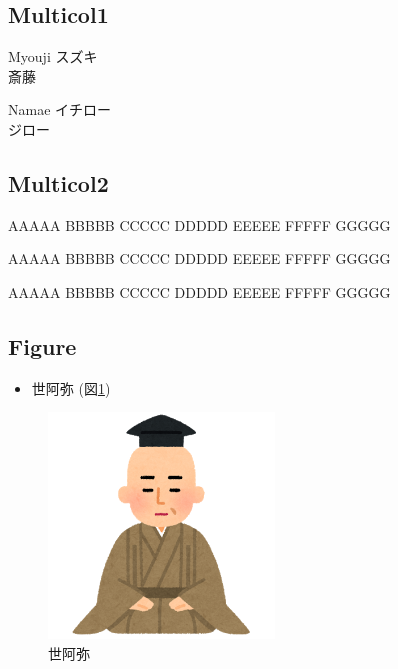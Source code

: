 \subsection{Multicol1}
\begin{multicols}{2}
  \begin{itembox}[l]{Myouji}
    スズキ\\
    斎藤
  \end{itembox}
  \begin{itembox}[l]{Namae}
    イチロー\\
    ジロー
  \end{itembox}
\end{multicols}


\subsection{Multicol2}
\begin{multicols}{2}
AAAAA
BBBBB
CCCCC
DDDDD
EEEEE
FFFFF
GGGGG

AAAAA
BBBBB
CCCCC
DDDDD
EEEEE
FFFFF
GGGGG

AAAAA
BBBBB
CCCCC
DDDDD
EEEEE
FFFFF
GGGGG
\end{multicols}

\subsection{Figure}
\begin{itemize}
  \item 世阿弥 (図\ref{figure:zeami})
\end{itemize}
\begin{figure}[htbp]
 \centering
 \includegraphics[width=60mm]{./image/nigaoe_zeami.png}
 \caption{世阿弥}
 \label{figure:zeami}
\end{figure}

